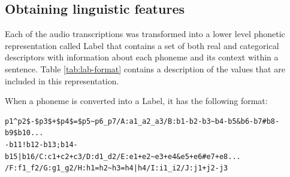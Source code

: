 \subsection{Obtaining linguistic features} \label{sec:ling-feat}

Each of the audio transcriptions was transformed into a lower level phonetic representation called Label that contains a set of both real and categorical descriptors with information about each phoneme and its context within a sentence. Table \ref{tab:lab-format} contains a description of the values that are included in this representation.

When a phoneme is converted into a Label, it has the following format:

\begin{lstlisting}
p1^p2$-$p3$+$p4$=$p5~p6_p7/A:a1_a2_a3/B:b1-b2-b3~b4-b5&b6-b7#b8-b9$b10...
-b11!b12-b13;b14-b15|b16/C:c1+c2+c3/D:d1_d2/E:e1+e2~e3+e4&e5+e6#e7+e8...
/F:f1_f2/G:g1_g2/H:h1=h2~h3=h4|h4/I:i1_i2/J:j1+j2-j3
\end{lstlisting}

